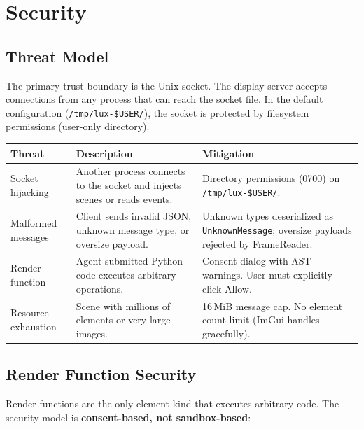 \documentclass[a4paper,10pt]{article}
\newcommand{\msg}[1]{\texttt{#1}}
\begin{document}
\section{Security}

\subsection{Threat Model}

The primary trust boundary is the Unix socket.  The display server
accepts connections from any process that can reach the socket file.
In the default configuration (\texttt{/tmp/lux-\$USER/}), the socket
is protected by filesystem permissions (user-only directory).

\begin{center}
\begin{tabular}{lp{5cm}p{5cm}}
\toprule
\textbf{Threat} & \textbf{Description} & \textbf{Mitigation} \\
\midrule
Socket hijacking    & Another process connects to the socket and
  injects scenes or reads events. & Directory permissions (0700) on
  \texttt{/tmp/lux-\$USER/}. \\
Malformed messages  & Client sends invalid JSON, unknown message type,
  or oversize payload. & Unknown types deserialized as
  \msg{UnknownMessage}; oversize payloads rejected by FrameReader. \\
Render function     & Agent-submitted Python code executes arbitrary
  operations. & Consent dialog with AST warnings.  User must
  explicitly click Allow. \\
Resource exhaustion & Scene with millions of elements or very large
  images. & 16\,MiB message cap.  No element count limit (ImGui
  handles gracefully). \\
\bottomrule
\end{tabular}
\end{center}

\subsection{Render Function Security}

Render functions are the only element kind that executes arbitrary
code.  The security model is \textbf{consent-based, not
sandbox-based}:
\end{document}
